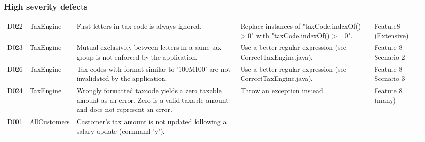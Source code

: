 \subsubsection{High severity defects}
\begin{table}[H]
\footnotesize 
\begin{tabularx}{\textwidth}{| c | P | X | X | P |}
\hline %
 &  &  &  &  \\
\hline %

D022 
& TaxEngine 
& First letters in tax code is always ignored.   
& Replace instances of "taxCode.indexOf() > 0" with "taxCode.indexOf() >= 0".
&  Feature8 (Extensive) \\%
\hline %
D023 
& TaxEngine 
& Mutual exclusivity between letters in a same tax group is not enforced by the application.
& Use a better regular expression (see CorrectTaxEngine.java).
& Feature 8 Scenario 2 \\
\hline %
D026 
& TaxEngine 
& Tax codes with format similar to '100M100' are not invalidated by the application.
& Use a better regular expression (see CorrectTaxEngine.java). 
& Feature 8 Scenario 3 \\
\hline %
D024 
& TaxEngine 
& Wrongly formatted taxcode yields a zero taxable amount as an error. Zero is a valid taxable amount and does not represent an error. 
& Throw an exception instead.
& Feature 8 (many)\\
\hline %
D001 
& AllCustomers 
& Customer's tax amount is not updated following a salary update (command 'y'). 

\end{tabularx}
\end{table}
